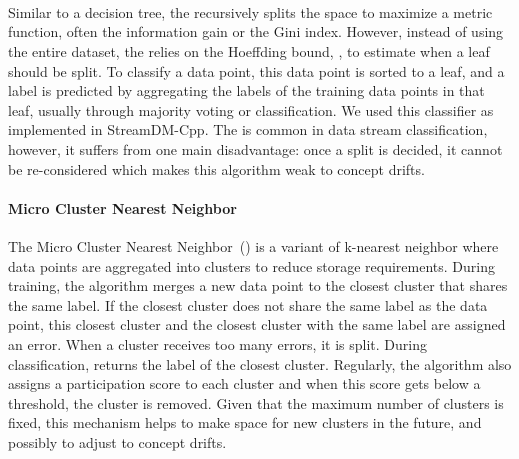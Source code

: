 \paragraph{\hoeffdingtree~\cite{VFDT}}
Similar to a decision tree, the \hoeffdingtree recursively splits the space to maximize a
metric function, often the
information gain or the Gini index. However,
instead of using the entire dataset, the \hoeffdingtree relies on the Hoeffding bound, , to estimate
when a leaf should be split. To classify a
data point, this data point is sorted to a leaf,
and a label is predicted by aggregating the labels of the training data points in that leaf, usually through
majority voting or \naivebayes classification.
We used this classifier as implemented in
StreamDM-Cpp.
The \hoeffdingtree is common in data stream
classification, however, it suffers from one main
disadvantage: once a split is decided, it cannot
be re-considered which makes this algorithm weak
to concept drifts.

\paragraph{Micro Cluster Nearest Neighbor~\cite{mc-nn}}
The Micro Cluster Nearest Neighbor~(\mcnn) is a
variant of k-nearest neighbor where data points are
aggregated into clusters to reduce storage requirements.  During training, the
algorithm merges a new data point to the closest
cluster that shares the same label. If the closest
cluster does not share the same label as the data
point, this closest cluster and the closest
cluster with the same label are assigned an error. When a cluster receives too
many errors, it is split. During classification,
\mcnn returns the label of the closest cluster.
Regularly, the algorithm also assigns a
participation score to each cluster and when this
score gets below a threshold, the cluster is
removed. Given that the maximum number of clusters
is fixed, this mechanism helps to make space for
new clusters in the future, and possibly to adjust to concept drifts.  

